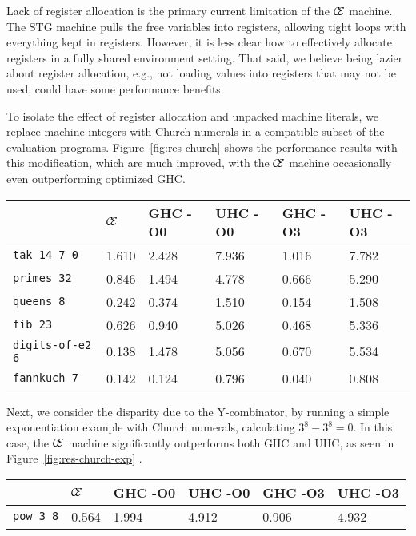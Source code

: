 Lack of register allocation is the primary current limitation of the $\mathcal{\mathcal{C} \mskip -4mu \mathcal{E}}$
machine. The STG machine pulls the free variables into registers, allowing tight
loops with everything kept in registers. However, it is less clear how to
effectively allocate registers in a fully shared environment setting.
That said, we believe being lazier about register allocation, e.g., not loading
values into registers that may not be used, could have some performance benefits.

To isolate the effect of register allocation and unpacked machine
literals, we replace machine integers with Church numerals in a compatible
subset of the evaluation programs. Figure~\ref{fig:res-church}
shows the performance results with this modification, which are much improved,
with the $\mathcal{\mathcal{C} \mskip -4mu \mathcal{E}}$ machine occasionally
even outperforming optimized GHC.

\begin{figure*}
\centering
\begin{tabularx}{\textwidth}{l | X | X | X | X | X}
& $\mathcal{\mathcal{C} \mskip -4mu \mathcal{E}}$ & GHC -O0 & UHC -O0 & GHC -O3 & UHC -O3 \\
\hline
\texttt{tak 14 7 0} & 1.610 & 2.428 & 7.936 & 1.016 & 7.782 \\
\texttt{primes 32} & 0.846 & 1.494 & 4.778 & 0.666 & 5.290 \\
\texttt{queens 8} & 0.242 & 0.374 & 1.510 & 0.154 & 1.508 \\
\texttt{fib 23} & 0.626 & 0.940 & 5.026 & 0.468 & 5.336 \\
\texttt{digits-of-e2 6} & 0.138 & 1.478 & 5.056 & 0.670 & 5.534 \\
\texttt{fannkuch 7} & 0.142 & 0.124 & 0.796 & 0.040 & 0.808 \\
\end{tabularx}
\caption{Church Numeral Benchmark Results. Measurement is wall clock time, 
units are seconds. Times averaged over 5 runs.}
\label{fig:res-church}
\end{figure*}

Next, we consider the disparity due to the Y-combinator, by running a simple
exponentiation example with Church numerals, calculating $3^8 - 3^8 = 0$. In
this case, the $\mathcal{\mathcal{C} \mskip -4mu \mathcal{E}}$ machine
significantly outperforms both GHC and UHC, as seen in
Figure~\ref{fig:res-church-exp} .

\begin{figure*}
\begin{tabularx}{\textwidth}{l | X | X | X | X | X}
& $\mathcal{\mathcal{C} \mskip -4mu \mathcal{E}}$ & GHC -O0 & UHC -O0 & GHC -O3 & UHC -O3 \\
\hline
\texttt{pow 3 8} & 0.564 & 1.994 & 4.912 & 0.906 & 4.932 \\
\end{tabularx}
\caption{Church Numeral Exponentiation Benchmark Results. Measurement is wall clock time, 
units are seconds. Times averaged over 5 runs.}
\label{fig:res-church-exp}
\end{figure*}

